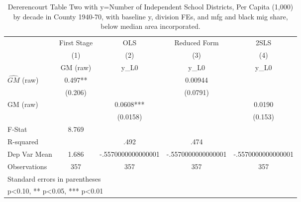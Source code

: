 \begin{table}[htbp]\centering
\def\sym#1{\ifmmode^{#1}\else\(^{#1}\)\fi}
\caption{Dererencourt Table Two with y=Number of Independent School Districts, Per Capita (1,000) by decade in County 1940-70, with baseline y, division FEs, and mfg and black mig share, below median area incorporated.}
\begin{tabular}{l*{4}{c}}
\toprule
                    & First Stage   &         OLS   &Reduced Form   &        2SLS   \\
                    &\multicolumn{1}{c}{(1)}&\multicolumn{1}{c}{(2)}&\multicolumn{1}{c}{(3)}&\multicolumn{1}{c}{(4)}\\
                    &\multicolumn{1}{c}{GM  (raw)}&\multicolumn{1}{c}{y\_L0}&\multicolumn{1}{c}{y\_L0}&\multicolumn{1}{c}{y\_L0}\\
\midrule
$\hat{GM}$ (raw)    &       0.497** &               &     0.00944   &               \\
                    &     (0.206)   &               &    (0.0791)   &               \\
\addlinespace
GM  (raw)           &               &      0.0608***&               &      0.0190   \\
                    &               &    (0.0158)   &               &     (0.153)   \\
\midrule
F-Stat              &       8.769   &               &               &               \\
R-squared           &               &        .492   &        .474   &               \\
Dep Var Mean        &       1.686   &-.5570000000000001   &-.5570000000000001   &-.5570000000000001   \\
Observations        &         357   &         357   &         357   &         357   \\
\bottomrule
\multicolumn{5}{l}{\footnotesize Standard errors in parentheses}\\
\multicolumn{5}{l}{\footnotesize * p<0.10, ** p<0.05, *** p<0.01}\\
\end{tabular}
\end{table}

